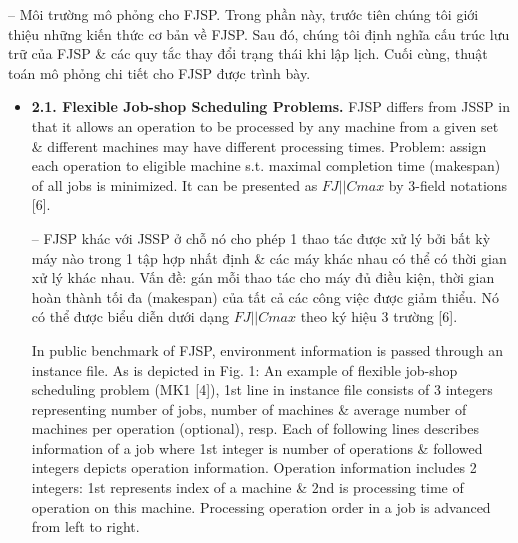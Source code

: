 \documentclass{article}
\begin{document}
\begin{itemize}
    -- {\sf Môi trường mô phỏng cho FJSP.} Trong phần này, trước tiên chúng tôi giới thiệu những kiến thức cơ bản về FJSP. Sau đó, chúng tôi định nghĩa cấu trúc lưu trữ của FJSP \& các quy tắc thay đổi trạng thái khi lập lịch. Cuối cùng, thuật toán mô phỏng chi tiết cho FJSP được trình bày.
    \begin{itemize}
        \item {\bf2.1. Flexible Job-shop Scheduling Problems.} FJSP differs from JSSP in that it allows an operation to be processed by any machine from a given set \& different machines may have different processing times. Problem: assign each operation to eligible machine s.t. maximal completion time (makespan) of all jobs is minimized. It can be presented as $FJ||Cmax$ by 3-field notations [6].

        -- FJSP khác với JSSP ở chỗ nó cho phép 1 thao tác được xử lý bởi bất kỳ máy nào trong 1 tập hợp nhất định \& các máy khác nhau có thể có thời gian xử lý khác nhau. Vấn đề: gán mỗi thao tác cho máy đủ điều kiện, thời gian hoàn thành tối đa (makespan) của tất cả các công việc được giảm thiểu. Nó có thể được biểu diễn dưới dạng $FJ||Cmax$ theo ký hiệu 3 trường [6].

        In public benchmark of FJSP, environment information is passed through an instance file. As is depicted in {\sf Fig. 1: An example of flexible job-shop scheduling problem (MK1 [4])}, 1st line in instance file consists of 3 integers representing number of jobs, number of machines \& average number of machines per operation (optional), resp. Each of following lines describes information of a job where 1st integer is number of operations \& followed integers depicts operation information. Operation information includes 2 integers: 1st represents index of a machine \& 2nd is processing time of operation on this machine. Processing operation order in a job is advanced from left to right.


\end{itemize}
\end{itemize}
\end{document}
